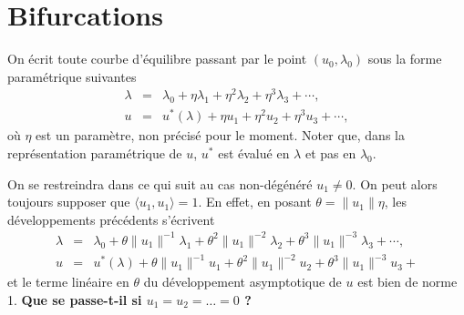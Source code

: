 \documentclass[12pt, final]{amsart}
\begin{document}
\section{Bifurcations}

On écrit toute courbe d'équilibre passant par le point $(u_0,
\lambda_0)$ sous la forme paramétrique suivantes
\begin{eqnarray}
  \lambda & = & \lambda_0 + \eta \lambda_1 + \eta^2 \lambda_2 + \eta^3
  \lambda_3 + \cdots,  \label{eq20211115075817}\\
  u & = & u^{\ast} (\lambda) + \eta u_1 + \eta^2 u_2 + \eta^3 u_3 + \cdots,
  \label{eq20211115075835}
\end{eqnarray}
o{\`u} $\eta$ est un param{\`e}tre, non précisé pour le moment. Noter
que, dans la représentation paramétrique de $u$, $u^{\ast}$ est
évalué en $\lambda$ et pas en $\lambda_0$.

On se restreindra dans ce qui suit au cas non-dégénéré $u_1
\neq 0$. On peut alors toujours supposer que $\langle u_1, u_1 \rangle = 1$.
En effet, en posant $\theta = \lVert u_1 \rVert \eta$, les développements
précédents s'écrivent
\begin{eqnarray}
  \lambda & = & \lambda_0 + \theta \lVert u_1 \rVert^{- 1} \lambda_1 + \theta^2 \lVert u_1 \rVert^{- 2} \lambda_2 + \theta^3
  \lVert u_1 \rVert^{- 3} \lambda_3 + \cdots, \\
  u & = & u^{\ast} (\lambda) + \theta \lVert u_1 \rVert^{- 1} u_1 + \theta^2 \lVert u_1 \rVert^{- 2} u_2 + \theta^3 \lVert u_1
  \rVert^{- 3} u_3 +
\end{eqnarray}
et le terme linéaire en $\theta$ du développement asymptotique de $u$
est bien de norme 1. \textbf{Que se passe-t-il si $u_1 = u_2 = \ldots = 0$
?}
\end{document}
